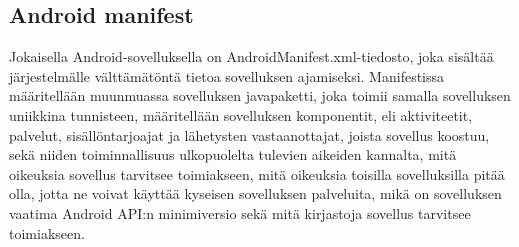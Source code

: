 \subsection{Android manifest}

Jokaisella Android-sovelluksella on AndroidManifest.xml-tiedosto, joka sisältää järjestelmälle välttämätöntä tietoa sovelluksen ajamiseksi. Manifestissa määritellään muunmuassa sovelluksen javapaketti, joka toimii samalla sovelluksen uniikkina tunnisteen, määritellään sovelluksen komponentit, eli aktiviteetit, palvelut, sisällöntarjoajat ja lähetysten vastaanottajat, joista sovellus koostuu, sekä niiden toiminnallisuus ulkopuolelta tulevien aikeiden kannalta, mitä oikeuksia sovellus tarvitsee toimiakseen, mitä oikeuksia toisilla sovelluksilla pitää olla, jotta ne voivat käyttää kyseisen sovelluksen palveluita, mikä on sovelluksen vaatima Android API:n minimiversio sekä mitä kirjastoja sovellus tarvitsee toimiakseen. \cite{android}